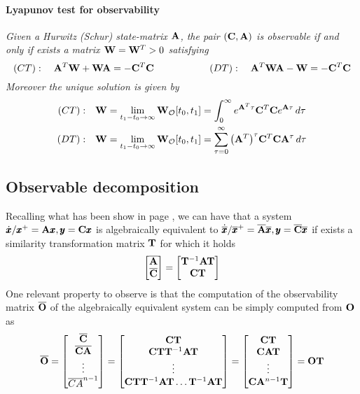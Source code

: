 	\paragraph{Lyapunov test for observability} {\itshape Given a Hurwitz (Schur) state-matrix $\mathbf{A}$, the pair $(\mathbf{C},\mathbf{A})$ is observable if and only if exists a matrix $\mathbf{W} = \mathbf{W}^T > 0$ satisfying
	\begin{equation}
		(CT): \quad \mathbf{A}^T \mathbf{W} + \mathbf{W} \mathbf{A}= - \mathbf{C}^T\mathbf{C} \hspace{2cm} (DT): \quad \mathbf{A}^T\mathbf{W} \mathbf{A} - \mathbf{W} = -\mathbf{C}^T\mathbf{C}
	\end{equation}	
	Moreover the unique solution is given by
	\begin{align*}
		(CT): \quad & \mathbf{W} = \lim_{t_1-t_0\rightarrow \infty} \mathbf{W}_{\mathcal O}[t_0,t_1] = \int_0^\infty e^{\mathbf{A}^T\tau} \mathbf{C}^T\mathbf{C} e^{\mathbf{A} \tau} \, d\tau \\
		(DT): \quad & \mathbf{W} = \lim_{t_1-t_0\rightarrow \infty} \mathbf{W}_{\mathcal O}[t_0,t_1] = \sum_{\tau = 0}^\infty \big(\mathbf{A}^T\big)^\tau \mathbf{C}^T\mathbf{C} \mathbf{A}^\tau \, d\tau \\
	\end{align*}}
	
\subsection{Observable decomposition}
	Recalling what has been show in page \pageref{eq:dynsys:algebraicequivalence}, we can have that a system $\dot{\pmb{x}}/\pmb{x}^+ = \mathbf{A}\pmb{x}, \pmb{y} =\mathbf{C}\pmb{x}$ is algebraically equivalent to $\dot{\overline{\pmb{x}}}/\overline {\pmb{x}}^+ = \overline {\mathbf{A}} \overline {\pmb{x}}, \pmb{y} = \overline {\mathbf{C}} \overline {\pmb{x}}$ if exists a similarity transformation matrix $\mathbf{T}$ for which it holds
	\[ \begin{bmatrix} \overline {\mathbf{A}} \\ \overline {\mathbf{C}}  \end{bmatrix} = \begin{bmatrix} \mathbf{T}^{-1}\mathbf{A}\mathbf{T} \\ \mathbf{C} \mathbf{T} \end{bmatrix} \]
	One relevant property to observe is that the computation of the observability matrix $\overline {\mathbf{O}}$ of the algebraically equivalent system can be simply computed from $\mathbf{O}$ as
	\[ \overline {\mathbf{O}} = \begin{bmatrix}  \overline {\mathbf{C}} \\ \overline {\mathbf{C}} \overline {\mathbf{A}} \\ \vdots \\ \overline{CA}^{n-1}  \end{bmatrix} = \begin{bmatrix} \mathbf{C} \mathbf{T} \\ \mathbf{C} \mathbf{T}\mathbf{T}^{-1} \mathbf{A} \mathbf{T} \\ \vdots \\ \mathbf{C} \mathbf{T}\mathbf{T}^{-1}\mathbf{A}\mathbf{T}\dots \mathbf{T}^{-1}\mathbf{A}\mathbf{T} \end{bmatrix} = \begin{bmatrix} \mathbf{C}\mathbf{T} \\ \mathbf{C}\mathbf{A}\mathbf{T} \\ \vdots \\ \mathbf{C}\mathbf{A}^{n-1}\mathbf{T} \end{bmatrix} = \mathbf{O}\mathbf{T} \]
	
